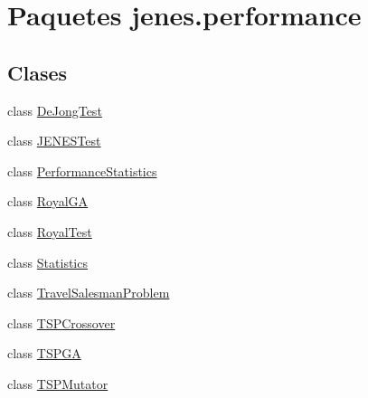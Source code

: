 \hypertarget{namespacejenes_1_1performance}{\section{Paquetes jenes.\-performance}
\label{namespacejenes_1_1performance}
}
\subsection*{Clases}
\begin{DoxyCompactItemize}
\item 
class \hyperlink{classjenes_1_1performance_1_1_de_jong_test}{De\-Jong\-Test}
\item 
class \hyperlink{classjenes_1_1performance_1_1_j_e_n_e_s_test}{J\-E\-N\-E\-S\-Test}
\item 
class \hyperlink{classjenes_1_1performance_1_1_performance_statistics}{Performance\-Statistics}
\item 
class \hyperlink{classjenes_1_1performance_1_1_royal_g_a}{Royal\-G\-A}
\item 
class \hyperlink{classjenes_1_1performance_1_1_royal_test}{Royal\-Test}
\item 
class \hyperlink{classjenes_1_1performance_1_1_statistics}{Statistics}
\item 
class \hyperlink{classjenes_1_1performance_1_1_travel_salesman_problem}{Travel\-Salesman\-Problem}
\item 
class \hyperlink{classjenes_1_1performance_1_1_t_s_p_crossover}{T\-S\-P\-Crossover}
\item 
class \hyperlink{classjenes_1_1performance_1_1_t_s_p_g_a}{T\-S\-P\-G\-A}
\item 
class \hyperlink{classjenes_1_1performance_1_1_t_s_p_mutator}{T\-S\-P\-Mutator}
\end{DoxyCompactItemize}
